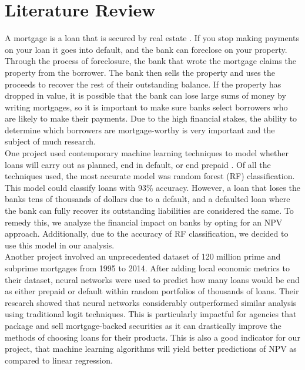 \documentclass[12 pt]{uncw_thesis}
\theoremstyle{plain}
\theoremstyle{remark}
\theoremstyle{definition}
\begin{document}
\section{Literature Review}
A mortgage is a loan that is secured by real estate \cite{Fannie}. If you stop making payments on your loan it goes into default, and the bank can foreclose on your property. Through the process of foreclosure, the bank  that  wrote the mortgage claims the property from the borrower. The bank then sells the property and uses the proceeds to recover the rest of their outstanding balance. If the property has dropped in value, it is possible that the bank can lose large sums of money by writing mortgages, so it is important to make sure banks select borrowers who are likely to make their payments. Due to the high financial stakes, the ability to determine which borrowers are mortgage-worthy is very important and the subject of much research.\\
One project used contemporary machine learning techniques to model whether loans will carry out as planned, end in default, or end prepaid \cite{Deng}. Of all the techniques used, the most accurate model was random forest (RF) classification. This model could classify loans with 93\% accuracy. However, a loan that loses the banks tens of thousands of dollars due to a default, and a defaulted loan where the bank can fully recover its outstanding liabilities are considered the same. To remedy this, we analyze the financial impact on banks by opting for an NPV approach. Additionally, due to the accuracy of RF classification, we decided to use this model in our analysis. \\ 
Another project involved an unprecedented dataset of 120 million prime and subprime mortgages from 1995 to 2014\cite{Sirignano}. After adding local economic metrics to their dataset, neural networks were used to predict how many loans would be end as either prepaid or default within random portfolios of thousands of loans. Their research showed that neural networks considerably outperformed similar analysis using traditional logit techniques. This is particularly impactful for agencies that package and sell mortgage-backed securities as it can drastically improve the methods of choosing loans for their products. This is also a good indicator for our project, that machine learning algorithms will yield better predictions of NPV as compared to linear regression.
\end{document}
